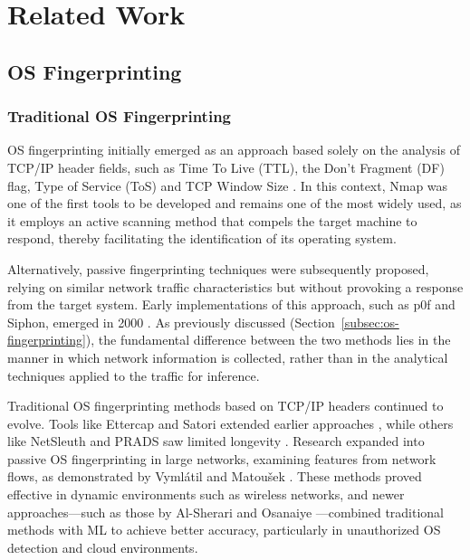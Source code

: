 \section{Related Work}
\label{sec:related-work}

\subsection{OS Fingerprinting}
\label{subsec:soa-os-fingerprinting}

\subsubsection{Traditional OS Fingerprinting}
\label{subsubsec:traditional-os-fingerprinting}

OS fingerprinting initially emerged as an approach based solely on the analysis of TCP/IP header fields, such as Time To Live (TTL), the Don't Fragment (DF) flag, Type of Service (ToS) and TCP Window Size \cite{nmaporg_nmap_nodate, lastovicka_passive_2023}. In this context, Nmap was one of the first tools to be developed and remains one of the most widely used, as it employs an active scanning method that compels the target machine to respond, thereby facilitating the identification of its operating system.

Alternatively, passive fingerprinting techniques were subsequently proposed, relying on similar network traffic characteristics but without provoking a response from the target system. Early implementations of this approach, such as p0f and Siphon, emerged in 2000 \cite{zalewski_p0f_nodate, beddoe_siphon_nodate}. As previously discussed (Section~\ref{subsec:os-fingerprinting}), the fundamental difference between the two methods lies in the manner in which network information is collected, rather than in the analytical techniques applied to the traffic for inference.

Traditional OS fingerprinting methods based on TCP/IP headers continued to evolve. Tools like Ettercap and Satori extended earlier approaches \cite{ornaghi_alberto_ettercap_2001, e_kollmann_satori_2018}, while others like NetSleuth and PRADS saw limited longevity \cite{netgrab_netsleuth_2012, eb_fjellskal_prads_2009}. Research expanded into passive OS fingerprinting in large networks, examining features from network flows, as demonstrated by Vymlátil and Matoušek \cite{vymlatil_detection_2014, matousek_gromovs_2014}. These methods proved effective in dynamic environments such as wireless networks, and newer approaches—such as those by Al-Sherari and Osanaiye \cite{al-shehari_improving_2014, osanaiye_tcpip_2015}—combined traditional methods with ML to achieve better accuracy, particularly in unauthorized OS detection and cloud environments.

